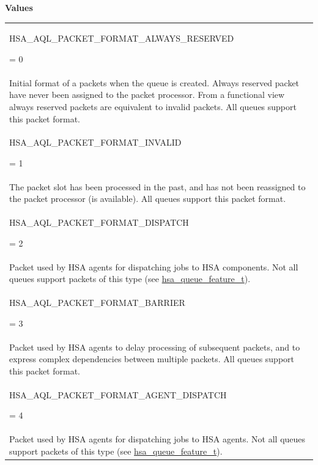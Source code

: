 \documentclass[final]{book}
\newcommand{\reftyp}[1]{#1}
\newcommand{\refenu}[1]{\reftyp{#1}}
\begin{document}
\noindent\textbf{Values}\\[-5mm]
\begin{longtable}{@{\hspace{2em}}p{\linewidth-2em}}
\hspace{-2em}\hypertarget{group__aql_1gga21e03ac6edb26e457468af5fe501b7adaaa022c87937de2531388a681182e4d36}{\refenu{HSA_\-AQL_\-PACKET_\-FORMAT_\-ALWAYS_\-RESERVED}} = 0\\Initial format of a packets when the queue is created. Always reserved packet have never been assigned to the packet processor. From a functional view always reserved packets are equivalent to invalid packets. All queues support this packet format.\\[2mm]
\hspace{-2em}\hypertarget{group__aql_1gga21e03ac6edb26e457468af5fe501b7adadc0bb64d5b0037718e716d57f6befb6a}{\refenu{HSA_\-AQL_\-PACKET_\-FORMAT_\-INVALID}} = 1\\The packet slot has been processed in the past, and has not been reassigned to the packet processor (is available). All queues support this packet format.\\[2mm]
\hspace{-2em}\hypertarget{group__aql_1gga21e03ac6edb26e457468af5fe501b7ada90d2a5dbd40f372f777402c83edf9d86}{\refenu{HSA_\-AQL_\-PACKET_\-FORMAT_\-DISPATCH}} = 2\\Packet used by HSA agents for dispatching jobs to HSA components. Not all queues support packets of this type (see \hyperlink{group__queue_1ga1145b01f6d9e2670179a22c92db39413}{hsa_\-queue_\-feature_\-t}).\\[2mm]
\hspace{-2em}\hypertarget{group__aql_1gga21e03ac6edb26e457468af5fe501b7adadaf10ccf48d374dfa87b7ad237a1788d}{\refenu{HSA_\-AQL_\-PACKET_\-FORMAT_\-BARRIER}} = 3\\Packet used by HSA agents to delay processing of subsequent packets, and to express complex dependencies between multiple packets. All queues support this packet format.\\[2mm]
\hspace{-2em}\hypertarget{group__aql_1gga21e03ac6edb26e457468af5fe501b7ada5189936e5f67be9e3463465aed69b008}{\refenu{HSA_\-AQL_\-PACKET_\-FORMAT_\-AGENT_\-DISPATCH}} = 4\\Packet used by HSA agents for dispatching jobs to HSA agents. Not all queues support packets of this type (see \hyperlink{group__queue_1ga1145b01f6d9e2670179a22c92db39413}{hsa_\-queue_\-feature_\-t}).
\end{longtable}
\end{document}

